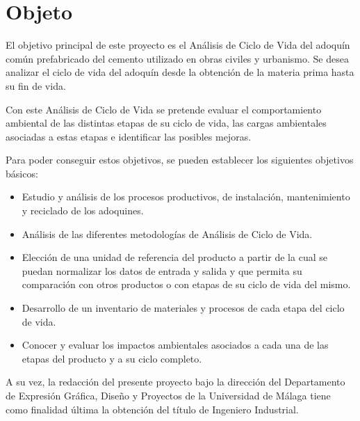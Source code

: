 \chapter{Objeto}\label{cap:objeto}
El objetivo principal de este proyecto es el Análisis de Ciclo de Vida del adoquín común prefabricado del cemento utilizado en obras civiles y urbanismo. Se desea analizar el ciclo de vida del adoquín desde la obtención de la materia prima hasta su fin de vida.

Con este Análisis de Ciclo de Vida se pretende evaluar el comportamiento ambiental de las distintas etapas de su ciclo de vida, las cargas ambientales asociadas a estas etapas e identificar las posibles mejoras.

Para poder conseguir estos objetivos, se pueden establecer los siguientes objetivos básicos:
\begin{itemize}
\item Estudio y análisis de los procesos productivos, de instalación, mantenimiento y reciclado de los adoquines.
\item Análisis de las diferentes metodologías de Análisis de Ciclo de Vida.
\item Elección de una unidad de referencia del producto a partir de la cual se puedan normalizar los datos de entrada y salida y que permita su comparación con otros productos o con etapas de su ciclo de vida del mismo.
\item Desarrollo de un inventario de materiales y procesos de cada etapa del ciclo de vida.
\item Conocer y evaluar los impactos ambientales asociados a cada una de las etapas del producto y a su ciclo completo.
\end{itemize}

A su vez, la redacción del presente proyecto bajo la dirección del Departamento de Expresión Gráfica, Diseño y Proyectos de la Universidad de Málaga tiene como finalidad última la obtención del título de Ingeniero Industrial.
